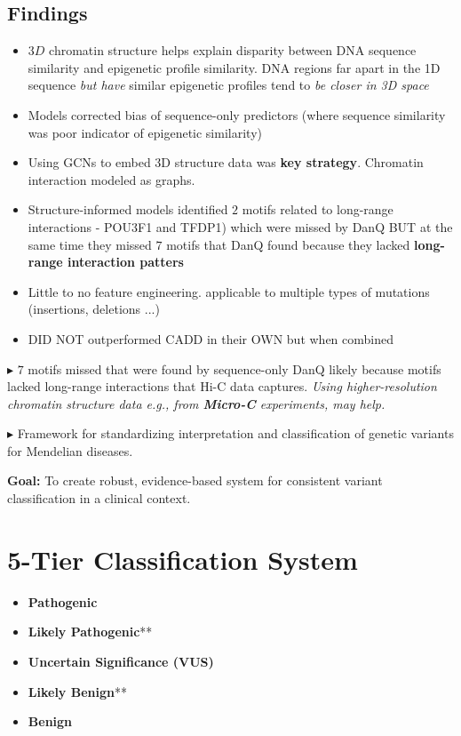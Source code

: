 \documentclass[../main.tex]{subfiles}
\begin{document}
\subsection{Findings}
\begin{itemize}
    \item $3D$ chromatin structure helps explain disparity between DNA sequence similarity and epigenetic profile similarity. DNA regions far apart in the 1D sequence \textit{but have} similar epigenetic profiles tend to \textit{be closer in 3D space}
    \item Models corrected bias of sequence-only predictors (where sequence similarity was poor indicator of epigenetic similarity)
    \item Using GCNs to embed 3D structure data was \textbf{key strategy}. Chromatin interaction modeled as graphs.
    \item Structure-informed models identified $2$ motifs related to long-range interactions - POU3F1 and TFDP1) which were missed by DanQ BUT at the same time they missed $7$ motifs that DanQ found because they lacked \textbf{long-range interaction patters}
    \item Little to no feature engineering. applicable to multiple types of mutations (insertions, deletions ...) 
    \item DID NOT outperformed CADD in their OWN but when combined
\end{itemize}

$\blacktriangleright$ $7$ motifs missed that were found by sequence-only DanQ likely because motifs lacked long-range interactions that Hi-C data captures. \textit{Using higher-resolution chromatin structure data e.g., from \textbf{Micro-C} experiments, may help.}

\hrulefill

 \cite{Richards2015}

\hrulefill

$\blacktriangleright$ Framework for standardizing interpretation and classification of genetic variants for Mendelian diseases. 

\textbf{Goal:} To create robust, evidence-based system for consistent variant classification in a clinical context. 

\section{5-Tier Classification System}
\begin{itemize}
    \item \textbf{Pathogenic}
    \item \textbf{Likely Pathogenic}**
    \item \textbf{Uncertain Significance (VUS)}
    \item \textbf{Likely Benign}**
    \item \textbf{Benign}
\end{itemize}
\end{document}
